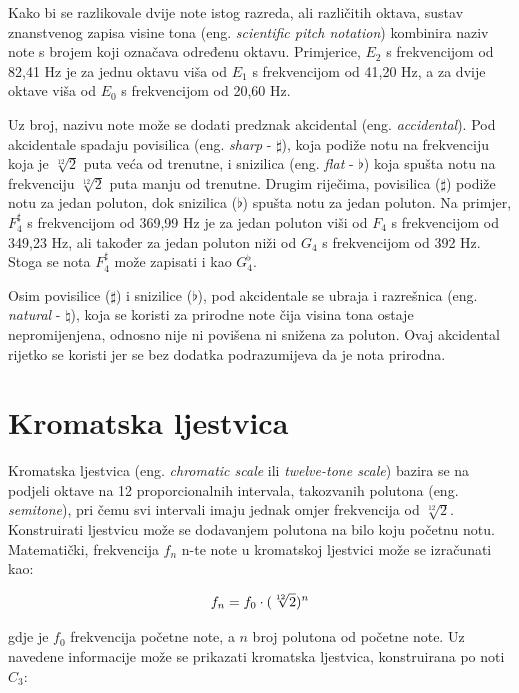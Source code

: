\documentclass[times, utf8, diplomski, numeric]{fer}
\begin{document}
Kako bi se razlikovale dvije note istog razreda, ali različitih oktava, sustav znanstvenog zapisa visine tona (eng. \textit{scientific pitch notation}) kombinira naziv note s brojem koji označava određenu oktavu.
Primjerice, $E_2$ s frekvencijom od 82,41 Hz je za jednu oktavu viša od $E_1$ s frekvencijom od 41,20 Hz, a za dvije oktave viša od $E_0$ s frekvencijom od 20,60 Hz.

Uz broj, nazivu note može se dodati predznak akcidental (eng. \textit{accidental}).\cite{pericic2008visejezicni} Pod akcidentale spadaju povisilica (eng. \textit{sharp} - $\sharp$), koja podiže notu na frekvenciju koja je $\sqrt[12]{2}$ puta veća od trenutne, i snizilica (eng. \textit{flat} - $\flat$) koja spušta notu na frekvenciju $\sqrt[12]{2}$ puta manju od trenutne. Drugim riječima, povisilica ($\sharp$) podiže notu za jedan poluton, dok snizilica ($\flat$) spušta notu za jedan poluton.\cite{hemu_2020}
Na primjer, $F_4^\sharp$ s frekvencijom od 369,99 Hz je za jedan poluton viši od $F_4$ s frekvencijom od 349,23 Hz, ali također za jedan poluton niži od $G_4$ s frekvencijom od 392 Hz. Stoga se nota $F_4^\sharp$ može zapisati i kao $G_4^\flat$.

Osim povisilice ($\sharp$) i snizilice ($\flat$), pod akcidentale se ubraja i razrešnica (eng. \textit{natural} - $\natural$), koja se koristi za prirodne note čija visina tona ostaje nepromijenjena, odnosno nije ni povišena ni snižena za poluton.\cite{benward2003introduction} Ovaj akcidental rijetko se koristi jer se bez dodatka podrazumijeva da je nota prirodna.

\section{Kromatska ljestvica}
Kromatska ljestvica (eng. \textit{chromatic scale} ili \textit{twelve-tone scale}) bazira se na podjeli oktave na 12 proporcionalnih intervala, takozvanih polutona (eng. \textit{semitone}), pri čemu svi intervali imaju jednak omjer frekvencija od $\sqrt[12]{2}$.\cite{sundberg1982tune} Konstruirati ljestvicu može se dodavanjem polutona na bilo koju početnu notu. Matematički, frekvencija $f_n$ n-te note u kromatskoj ljestvici može se izračunati kao:

\begin{equation}
	f_n = f_0 \cdot (\sqrt[12]{2})^n\\
\end{equation}

gdje je $f_0$ frekvencija početne note, a $n$ broj polutona od početne note. Uz navedene informacije može se prikazati kromatska ljestvica, konstruirana po noti $C_3$:
\end{document}
